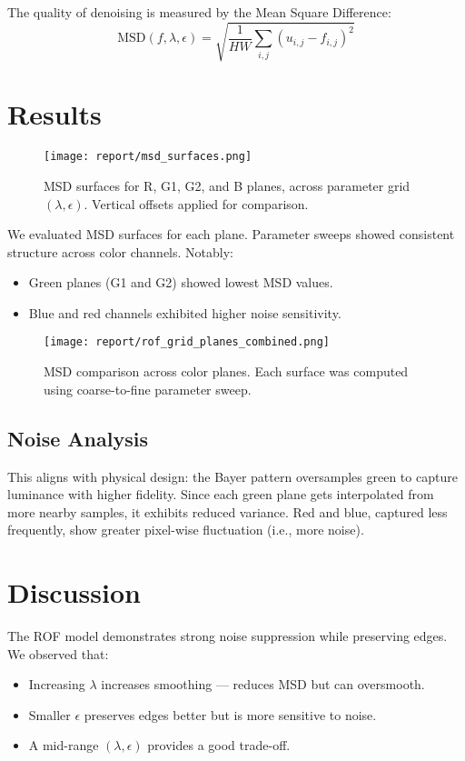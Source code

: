 \documentclass[11pt]{article}
\begin{document}
The quality of denoising is measured by the Mean Square Difference:
\[
\text{MSD}(f, \lambda, \epsilon) = \sqrt{\frac{1}{HW} \sum_{i,j} (u_{i,j} - f_{i,j})^2}
\]

\section*{Results}

\begin{figure}[h!]
    \centering
    \texttt{[image: report/msd\_surfaces.png]}
    \caption{MSD surfaces for R, G1, G2, and B planes, across parameter grid $(\lambda, \epsilon)$. Vertical offsets applied for comparison.}
\end{figure}

We evaluated MSD surfaces for each plane. Parameter sweeps showed consistent structure across color channels. Notably:

\begin{itemize}
  \item Green planes (G1 and G2) showed lowest MSD values.
  \item Blue and red channels exhibited higher noise sensitivity.
\end{itemize}

\begin{figure}[h!]
\centering
\texttt{[image: report/rof\_grid\_planes\_combined.png]}
\caption{MSD comparison across color planes. Each surface was computed using coarse-to-fine parameter sweep.}
\end{figure}

\subsection*{Noise Analysis}
This aligns with physical design: the Bayer pattern oversamples green to capture luminance with higher fidelity. Since each green plane gets interpolated from more nearby samples, it exhibits reduced variance. Red and blue, captured less frequently, show greater pixel-wise fluctuation (i.e., more noise).

\section*{Discussion}
The ROF model demonstrates strong noise suppression while preserving edges. We observed that:
\begin{itemize}
  \item Increasing \(\lambda\) increases smoothing — reduces MSD but can oversmooth.
  \item Smaller \(\epsilon\) preserves edges better but is more sensitive to noise.
  \item A mid-range \((\lambda, \epsilon)\) provides a good trade-off.
\end{itemize}
\end{document}
